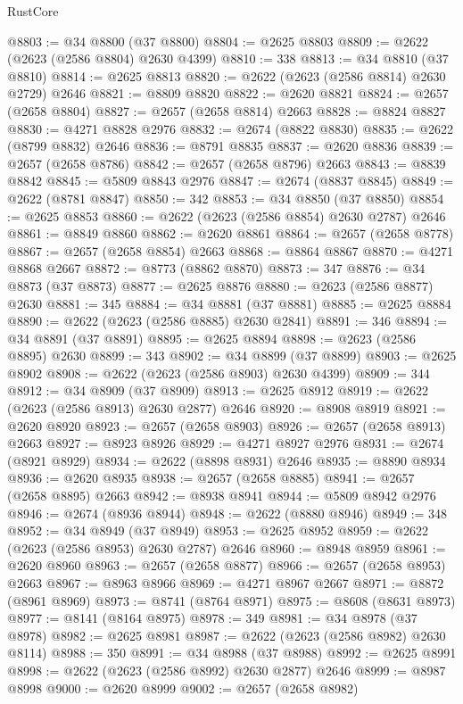 \begin{lexlean}{RustCore}
\begin{coremodule}
@8803 := @34 @8800 (@37 @8800)
@8804 := @2625 @8803
@8809 := @2622 (@2623 (@2586 @8804) @2630 @4399)
@8810 := 338
@8813 := @34 @8810 (@37 @8810)
@8814 := @2625 @8813
@8820 := @2622 (@2623 (@2586 @8814) @2630 @2729) @2646
@8821 := @8809 @8820
@8822 := @2620 @8821
@8824 := @2657 (@2658 @8804)
@8827 := @2657 (@2658 @8814) @2663
@8828 := @8824 @8827
@8830 := @4271 @8828 @2976
@8832 := @2674 (@8822 @8830)
@8835 := @2622 (@8799 @8832) @2646
@8836 := @8791 @8835
@8837 := @2620 @8836
@8839 := @2657 (@2658 @8786)
@8842 := @2657 (@2658 @8796) @2663
@8843 := @8839 @8842
@8845 := @5809 @8843 @2976
@8847 := @2674 (@8837 @8845)
@8849 := @2622 (@8781 @8847)
@8850 := 342
@8853 := @34 @8850 (@37 @8850)
@8854 := @2625 @8853
@8860 := @2622 (@2623 (@2586 @8854) @2630 @2787) @2646
@8861 := @8849 @8860
@8862 := @2620 @8861
@8864 := @2657 (@2658 @8778)
@8867 := @2657 (@2658 @8854) @2663
@8868 := @8864 @8867
@8870 := @4271 @8868 @2667
@8872 := @8773 (@8862 @8870)
@8873 := 347
@8876 := @34 @8873 (@37 @8873)
@8877 := @2625 @8876
@8880 := @2623 (@2586 @8877) @2630
@8881 := 345
@8884 := @34 @8881 (@37 @8881)
@8885 := @2625 @8884
@8890 := @2622 (@2623 (@2586 @8885) @2630 @2841)
@8891 := 346
@8894 := @34 @8891 (@37 @8891)
@8895 := @2625 @8894
@8898 := @2623 (@2586 @8895) @2630
@8899 := 343
@8902 := @34 @8899 (@37 @8899)
@8903 := @2625 @8902
@8908 := @2622 (@2623 (@2586 @8903) @2630 @4399)
@8909 := 344
@8912 := @34 @8909 (@37 @8909)
@8913 := @2625 @8912
@8919 := @2622 (@2623 (@2586 @8913) @2630 @2877) @2646
@8920 := @8908 @8919
@8921 := @2620 @8920
@8923 := @2657 (@2658 @8903)
@8926 := @2657 (@2658 @8913) @2663
@8927 := @8923 @8926
@8929 := @4271 @8927 @2976
@8931 := @2674 (@8921 @8929)
@8934 := @2622 (@8898 @8931) @2646
@8935 := @8890 @8934
@8936 := @2620 @8935
@8938 := @2657 (@2658 @8885)
@8941 := @2657 (@2658 @8895) @2663
@8942 := @8938 @8941
@8944 := @5809 @8942 @2976
@8946 := @2674 (@8936 @8944)
@8948 := @2622 (@8880 @8946)
@8949 := 348
@8952 := @34 @8949 (@37 @8949)
@8953 := @2625 @8952
@8959 := @2622 (@2623 (@2586 @8953) @2630 @2787) @2646
@8960 := @8948 @8959
@8961 := @2620 @8960
@8963 := @2657 (@2658 @8877)
@8966 := @2657 (@2658 @8953) @2663
@8967 := @8963 @8966
@8969 := @4271 @8967 @2667
@8971 := @8872 (@8961 @8969)
@8973 := @8741 (@8764 @8971)
@8975 := @8608 (@8631 @8973)
@8977 := @8141 (@8164 @8975)
@8978 := 349
@8981 := @34 @8978 (@37 @8978)
@8982 := @2625 @8981
@8987 := @2622 (@2623 (@2586 @8982) @2630 @8114)
@8988 := 350
@8991 := @34 @8988 (@37 @8988)
@8992 := @2625 @8991
@8998 := @2622 (@2623 (@2586 @8992) @2630 @2877) @2646
@8999 := @8987 @8998
@9000 := @2620 @8999
@9002 := @2657 (@2658 @8982)

\end{coremodule}
\end{lexlean}
